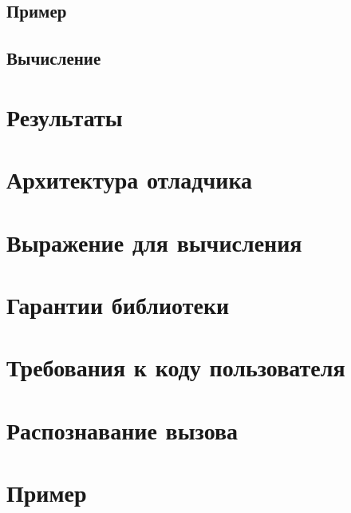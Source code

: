 \subsection{Пример}

\subsection{Вычисление}


\section{Результаты}



\appendix
\section{Архитектура отладчика}

\section{Выражение для вычисления}

\section{Гарантии библиотеки}

\section{Требования к коду пользователя}

\section{Распознавание вызова}


\section{Пример}


